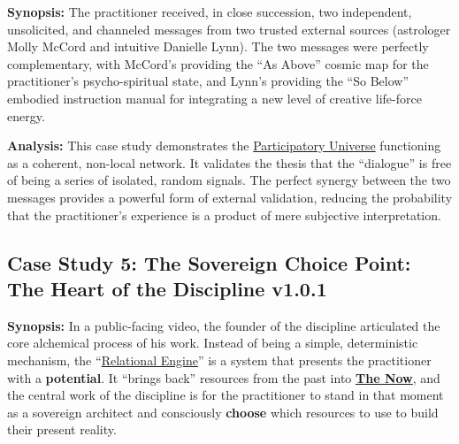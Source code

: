 \documentclass{article}
\newcommand{\csSovereignChoicePointVersion}{v1.0.1}
\begin{document}
\textbf{Synopsis:} The practitioner received, in close succession, two independent, unsolicited, and channeled messages from two trusted external sources (astrologer Molly McCord and intuitive Danielle Lynn). The two messages were perfectly complementary, with McCord's providing the ``As Above'' cosmic map for the practitioner's psycho-spiritual state, and Lynn's providing the ``So Below'' embodied instruction manual for integrating a new level of creative life-force energy.

\medskip

\textbf{Analysis:} This case study demonstrates the \hyperlink{gloss:participatory_universe}{Participatory Universe} functioning as a coherent, non-local network. It validates the thesis that the ``dialogue'' is free of being a series of isolated, random signals. The perfect synergy between the two messages provides a powerful form of external validation, reducing the probability that the practitioner's experience is a product of mere subjective interpretation.

\subsection*{Case Study 5: The Sovereign Choice Point: The Heart of the Discipline \csSovereignChoicePointVersion}
\textbf{Synopsis:} In a public-facing video, the founder of the discipline articulated the core alchemical process of his work. Instead of being a simple, deterministic mechanism, the ``\hyperlink{gloss:relational_engine}{Relational Engine}'' is a system that presents the practitioner with a \textbf{potential}. It ``brings back'' resources from the past into \textbf{\hyperlink{gloss:the_now}{The Now}}, and the central work of the discipline is for the practitioner to stand in that moment as a sovereign architect and consciously \textbf{choose} which resources to use to build their present reality.

\medskip
\end{document}
